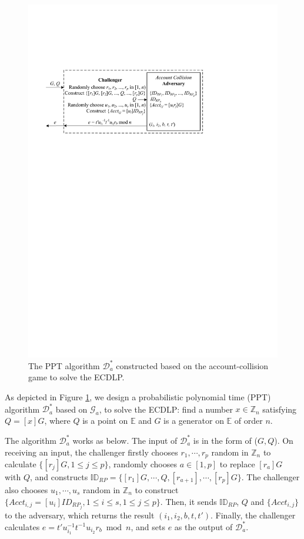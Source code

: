 \begin{figure}[tb]
  \centering
  \includegraphics[width=0.96\linewidth]{fig/ecdlp_algorithm2.pdf}
  \caption{The PPT algorithm $\mathcal{D}^*_a$ constructed based on the account-collision game to solve the ECDLP.}
  \label{fig:collision_account}
\end{figure}

As depicted in Figure \ref{fig:collision_account}, we design a probabilistic polynomial time (PPT) algorithm $\mathcal{D}^*_a$ based on $\mathcal{G}_a$, to solve the ECDLP: find a number $x \in \mathbb{Z}_n$ satisfying $Q = [x]G$, where $Q$ is a point on $\mathbb{E}$ and $G$ is a generator on $\mathbb{E}$ of order $n$.

The algorithm $\mathcal{D}^*_a$ works as below.
The input of $\mathcal{D}^*_a$ is in the form of ($G, Q$). On receiving an input, the challenger firstly chooses $r_1, \cdots, r_p$  random in $\mathbb{Z}_n$ to calculate $\{[r_j]G, 1\leq j \leq p\}$,
 randomly chooses $a \in [1,p]$ to replace $[r_{a}]G$ with $Q$,
 and constructs $\mathbb{ID}_{RP} = \{[r_1]G, \cdots, Q, [r_{a+1}], \cdots, [r_{p}]G\}$.
The challenger also chooses $u_1, \cdots, u_s$ random in $\mathbb{Z}_n$ to construct $\{Acct_{i,j}= [u_i]ID_{RP_j}, 1\leq i \leq s, 1 \leq j \leq p\}$.
Then, it sends $\mathbb{ID}_{RP}$, $Q$ and $\{Acct_{i,j}\}$ to the adversary, which returns the result $(i_1, i_2, b, t, t')$.
 Finally, the challenger calculates $e = t'u_{i_1}^{-1}t^{-1}u_{i_2}r_{b} \bmod n$, and sets $e$ as the output of $\mathcal{D}^*_a$.

